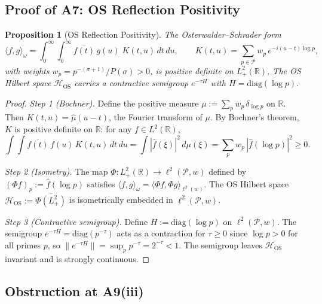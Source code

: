 \documentclass[12pt,a4paper]{article}
\newtheorem{proposition}[theorem]{Proposition}
\theoremstyle{definition}
\theoremstyle{remark}
\newcommand{\PP}{\mathcal{P}}
\begin{document}
\subsection{Proof of A7: OS Reflection Positivity}

\begin{proposition}[OS Reflection Positivity]\label{prop:A7-proof}
The Osterwalder--Schrader form
\[
  \langle f, g \rangle_\omega
  = \int_0^\infty \!\!\int_0^\infty
    \overline{f(t)}\,g(u)\; K(t,u)\,dt\,du,
  \qquad
  K(t,u) = \sum_{p \in \PP} w_p\, e^{-i(u-t)\log p},
\]
with weights $w_p = p^{-(\sigma+1)}/P(\sigma) > 0$, is positive definite on $L^2_+(\mathbb{R})$. The OS Hilbert space $\mathcal{H}_{\mathrm{OS}}$ carries a contractive semigroup $e^{-\tau H}$ with $H = \mathrm{diag}(\log p)$.
\end{proposition}

\begin{proof}
\emph{Step 1 (Bochner).}
Define the positive measure $\mu := \sum_{p} w_p\,\delta_{\log p}$ on $\mathbb{R}$. Then $K(t,u) = \hat{\mu}(u-t)$, the Fourier transform of $\mu$. By Bochner's theorem, $K$ is positive definite on $\mathbb{R}$: for any $f \in L^2(\mathbb{R})$,
\[
  \int\!\!\int \overline{f(t)}\,f(u)\,K(t,u)\,dt\,du
  = \int |\hat{f}(\xi)|^2\,d\mu(\xi)
  = \sum_p w_p\,|\hat{f}(\log p)|^2 \ge 0.
\]

\emph{Step 2 (Isometry).}
The map $\Phi: L^2_+(\mathbb{R}) \to \ell^2(\PP, w)$ defined by $(\Phi f)_p := \hat{f}(\log p)$ satisfies $\langle f, g\rangle_\omega = \langle \Phi f, \Phi g\rangle_{\ell^2(w)}$. The OS Hilbert space $\mathcal{H}_{\mathrm{OS}} := \overline{\Phi(L^2_+)}$ is isometrically embedded in $\ell^2(\PP, w)$.

\emph{Step 3 (Contractive semigroup).}
Define $H := \mathrm{diag}(\log p)$ on $\ell^2(\PP, w)$. The semigroup $e^{-\tau H} = \mathrm{diag}(p^{-\tau})$ acts as a contraction for $\tau \ge 0$ since $\log p > 0$ for all primes $p$, so $\|e^{-\tau H}\| = \sup_p p^{-\tau} = 2^{-\tau} < 1$. The semigroup leaves $\mathcal{H}_{\mathrm{OS}}$ invariant and is strongly continuous.
\end{proof}

\subsection{Obstruction at A9(iii)}
\end{document}
